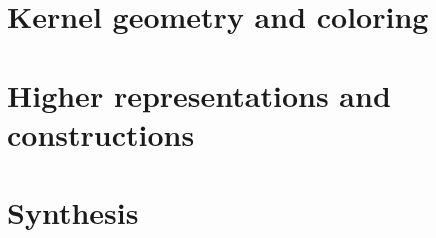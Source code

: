 \documentclass[graybox,envcountchap]{svmono}
\begin{document}
\part{Kernel geometry and coloring}




\part{Higher representations and constructions}




\part{Synthesis}


\appendix




\backmatter

\renewcommand{\indexname}{Subject Index}
\printindex
\end{document}
